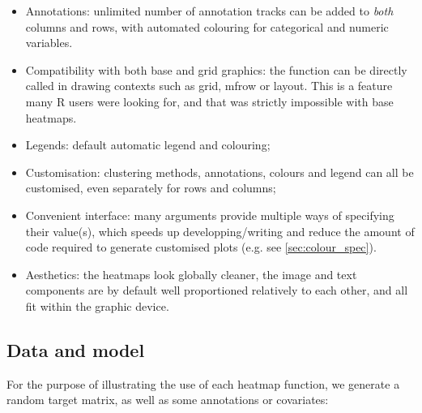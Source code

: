 \documentclass[a4paper]{article}\usepackage{graphicx, color}
\begin{document}
\begin{itemize}
\item Annotations: unlimited number of annotation tracks can be added to 
\emph{both} columns and rows, with automated colouring for categorical and 
numeric variables.
\item Compatibility with both base and grid graphics: the function can be 
directly called in drawing contexts such as grid, mfrow or layout.
This is a feature many R users were looking for, and that was strictly 
impossible with base heatmaps.
\item Legends: default automatic legend and colouring;
\item Customisation: clustering methods, annotations, colours and legend can all 
be customised, even separately for rows and columns;
\item Convenient interface: many arguments provide multiple ways of 
specifying their value(s), which speeds up developping/writing and reduce the 
amount of code required to generate customised plots (e.g. see
\cref{sec:colour_spec}).
\item Aesthetics: the heatmaps look globally cleaner, the image and text components 
are by default well proportioned relatively to each other, and all fit within 
the graphic device.
\end{itemize}

\subsection{Data and model}
\label{sec:data}

For the purpose of illustrating the use of each heatmap function, we generate a 
random target matrix, as well as some annotations or covariates:
\end{document}
